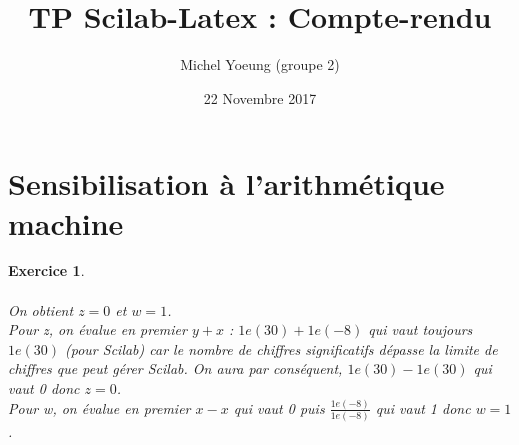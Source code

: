 \documentclass[a4paper,11pt]{article}
\title{TP Scilab-Latex : Compte-rendu}
\author{Michel Yoeung (groupe 2)}
\date{22 Novembre 2017}
\newtheorem{exo}{Exercice}
\begin{document}
\maketitle

\section{Sensibilisation à l'arithmétique machine}

\begin{exo} \ \\ \\
On obtient $ z=0 $ et $ w=1 $. \\
Pour z, on évalue en premier $ y+x $ : $ 1e(30)+1e(-8) $ qui vaut toujours $ 1e(30) $ (pour Scilab) car le nombre de chiffres significatifs dépasse la limite de chiffres que peut gérer Scilab. On aura par conséquent, $ 1e(30)-1e(30) $ qui vaut 0 donc $ z=0 $. \\
Pour w, on évalue en premier $ x-x $ qui vaut 0 puis $ \frac{1e(-8)}{1e(-8)} $ qui vaut 1 donc $ w=1 $.
\end{exo}
\end{document}

